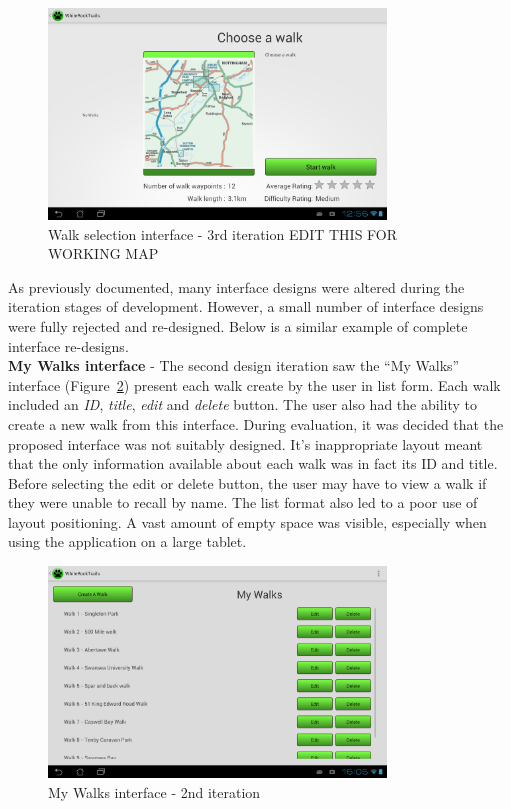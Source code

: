 \documentclass[11pt,a4paper]{report}
\begin{document}
\begin{figure}[H]
    \centering
    \includegraphics[width=0.8\textwidth]{chris/final_choose_walk}
    \caption{Walk selection interface - 3rd iteration EDIT THIS FOR WORKING MAP}
    \label{fig:choose_walk3}
\end{figure}


As previously documented, many interface designs were altered during the iteration stages of development. However, a small number of interface designs were fully rejected and re-designed. Below is a similar example of complete interface re-designs.\\

\textbf{My Walks interface} - The second design iteration saw the ``My Walks'' interface (Figure~\ref{fig:app_my_walks_view1}) present each walk create by the user in list form. Each walk included an \emph{ID}, \emph{title}, \emph{edit} and \emph{delete} button. The user also had the ability to create a new walk from this interface. During evaluation, it was decided that the proposed interface was not suitably designed. It's inappropriate layout meant that the only information available about each walk was in fact its ID and title. Before selecting the edit or delete button, the user may have to view a walk if they were unable to recall by name. The list format also led to a poor use of layout positioning. A vast amount of empty space was visible, especially when using the application on a large tablet.

\begin{figure}[H]
    \centering
    \includegraphics[width=0.8\textwidth]{chris/app_my_walks_view}
    \caption{My Walks interface - 2nd iteration}
    \label{fig:app_my_walks_view1}
\end{figure}
\end{document}
